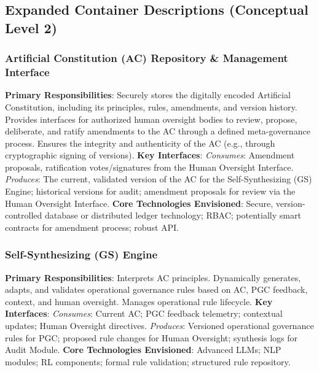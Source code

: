 \documentclass[sigconf,review,anonymous=false]{acmart} %
\begin{document}
\subsection{Expanded Container Descriptions (Conceptual Level 2)}
\label{app:architecture_details_containers}
\subsubsection{Artificial Constitution (AC) Repository \& Management Interface}
\label{app:architecture_details_ac_repo}
\textbf{Primary Responsibilities}: Securely stores the digitally encoded Artificial Constitution, including its principles, rules, amendments, and version history. Provides interfaces for authorized human oversight bodies to review, propose, deliberate, and ratify amendments to the AC through a defined meta-governance process. Ensures the integrity and authenticity of the AC (e.g., through cryptographic signing of versions).
\textbf{Key Interfaces}:
    \textit{Consumes}: Amendment proposals, ratification votes/signatures from the Human Oversight Interface.
    \textit{Produces}: The current, validated version of the AC for the Self-Synthesizing (GS) Engine; historical versions for audit; amendment proposals for review via the Human Oversight Interface.
\textbf{Core Technologies Envisioned}: Secure, version-controlled database or distributed ledger technology; RBAC; potentially smart contracts for amendment process; robust API.

\subsubsection{Self-Synthesizing (GS) Engine}
\label{app:architecture_details_gs_engine}
\textbf{Primary Responsibilities}: Interprets AC principles. Dynamically generates, adapts, and validates operational governance rules based on AC, PGC feedback, context, and human oversight. Manages operational rule lifecycle.
\textbf{Key Interfaces}:
    \textit{Consumes}: Current AC; PGC feedback telemetry; contextual updates; Human Oversight directives.
    \textit{Produces}: Versioned operational governance rules for PGC; proposed rule changes for Human Oversight; synthesis logs for Audit Module.
\textbf{Core Technologies Envisioned}: Advanced LLMs; NLP modules; RL components; formal rule validation; structured rule repository.
\end{document}
